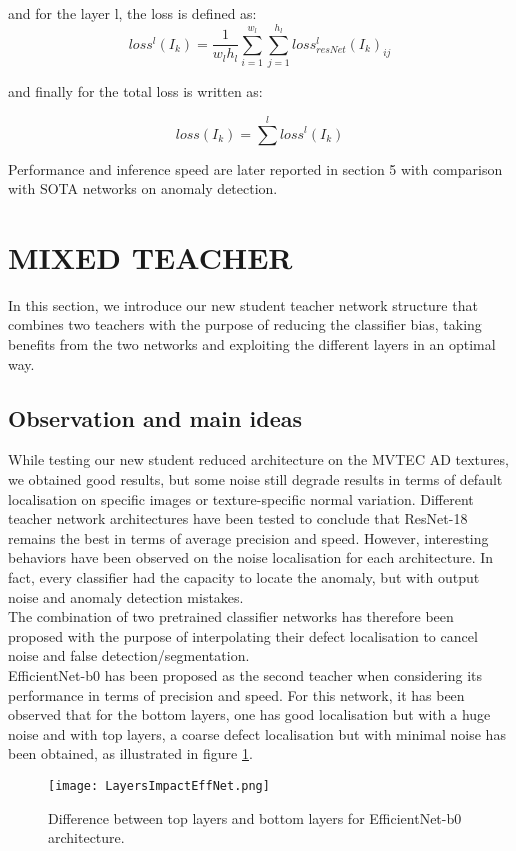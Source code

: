 \documentclass[a4paper,twoside]{article}
\begin{document}
\noindent and for the layer l, the loss is defined as: 
\begin{equation}
loss^{l}(I_k)=\frac{1}{w_lh_l}  \sum_{i=1}^{w_l} \sum_{j=1}^{h_l} loss_{resNet}^l(I_k)_{ij}  
\label{eq.3}
\end{equation}

\noindent  and finally for the total loss is written as: 

\begin{equation}
loss(I_k)= \sum^{l} loss^{l}(I_k) 
\label{eq.4}
\end{equation}

Performance and inference speed are later reported in section 5 with comparison with SOTA networks on anomaly detection.

\section{MIXED TEACHER}
In this section, we introduce our new student teacher network structure that combines two teachers with the purpose of reducing the classifier bias, taking benefits from the two networks and exploiting the different layers in an optimal way.

\subsection{Observation and main ideas}
While testing our new student reduced architecture on the MVTEC AD textures, we obtained good results, but some noise still degrade results in terms of default localisation on specific images or texture-specific normal variation. Different teacher network architectures have been tested to conclude that ResNet-18 remains the best in terms of average precision and speed. However,  interesting behaviors have been observed on the noise localisation for each architecture. In fact, every classifier had the capacity to locate the anomaly, but with output noise and anomaly detection mistakes. \\
The combination of two pretrained classifier networks has therefore been proposed with the purpose of interpolating their defect localisation to cancel noise and false detection/segmentation. \\
EfficientNet-b0 has been proposed as the second teacher when considering its performance in terms of precision and speed. For this network, it has been observed that for the bottom layers, one has good localisation but with a huge noise and with top layers, a coarse defect localisation but with minimal noise has been obtained, as illustrated in figure \ref{Fig.2}.
\begin{figure}[h]
\centerline{\texttt{[image: LayersImpactEffNet.png]}}
\renewcommand{\arraystretch}{1}
\captionsetup{justification=centering}
\caption{ 
Difference between top layers and bottom layers for EfficientNet-b0 architecture.}
\label{Fig.2}
\end{figure}
\end{document}
